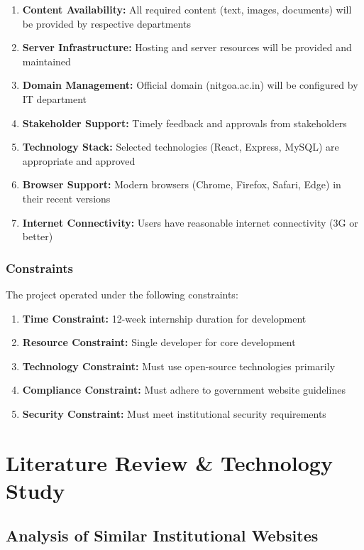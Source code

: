 \documentclass[12pt,a4paper]{report}
\begin{document}
\begin{enumerate}
    \item \textbf{Content Availability:} All required content (text, images, documents) will be provided by respective departments
    \item \textbf{Server Infrastructure:} Hosting and server resources will be provided and maintained
    \item \textbf{Domain Management:} Official domain (nitgoa.ac.in) will be configured by IT department
    \item \textbf{Stakeholder Support:} Timely feedback and approvals from stakeholders
    \item \textbf{Technology Stack:} Selected technologies (React, Express, MySQL) are appropriate and approved
    \item \textbf{Browser Support:} Modern browsers (Chrome, Firefox, Safari, Edge) in their recent versions
    \item \textbf{Internet Connectivity:} Users have reasonable internet connectivity (3G or better)
\end{enumerate}

\subsection*{Constraints}

The project operated under the following constraints:

\begin{enumerate}
    \item \textbf{Time Constraint:} 12-week internship duration for development
    \item \textbf{Resource Constraint:} Single developer for core development
    \item \textbf{Technology Constraint:} Must use open-source technologies primarily
    \item \textbf{Compliance Constraint:} Must adhere to government website guidelines
    \item \textbf{Security Constraint:} Must meet institutional security requirements
\end{enumerate}
\chapter{Literature Review \& Technology Study}

\section{Analysis of Similar Institutional Websites}
\end{document}
